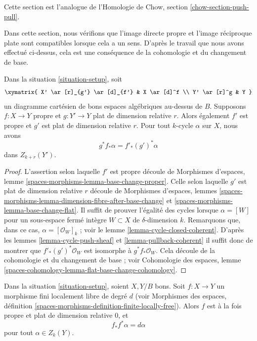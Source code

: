 \noindent
Cette section est l'analogue de l'Homologie de Chow, section
\ref{chow-section-push-pull}.

\medskip\noindent
Dans cette section, nous vérifions que l'image directe propre et l'image
réciproque plate sont compatibles lorsque cela a un sens. D'après le travail que
nous avons effectué ci-dessus, cela est une conséquence de la cohomologie et
du changement de base.

\begin{lemma}
\label{lemma-flat-pullback-proper-pushforward}
Dans la situation \ref{situation-setup}, soit
$$
\xymatrix{
X' \ar[r]_{g'} \ar[d]_{f'} & X \ar[d]^f \\
Y' \ar[r]^g & Y
}
$$
un diagramme cartésien de bons espaces algébriques au-dessus de $B$.
Supposons $f : X \to Y$ propre et $g : Y' \to Y$ plat de dimension
relative $r$. Alors également $f'$ est propre et $g'$ est plat de dimension
relative $r$. Pour tout $k$-cycle $\alpha$ sur $X$, nous avons
$$
g^*f_*\alpha = f'_*(g')^*\alpha
$$
dans $Z_{k + r}(Y')$.
\end{lemma}

\begin{proof}
L'assertion selon laquelle $f'$ est propre découle de Morphismes d'espaces,
lemme \ref{spaces-morphisms-lemma-base-change-proper}. Celle selon laquelle
$g'$ est plat de dimension relative $r$ découle de Morphismes d'espaces, lemmes
\ref{spaces-morphisms-lemma-dimension-fibre-after-base-change} et
\ref{spaces-morphisms-lemma-base-change-flat}. Il suffit de prouver l'égalité
des cycles lorsque $\alpha = [W]$ pour un sous-espace fermé intègre $W
\subset X$ de $\delta$-dimension $k$. Remarquons que, dans ce cas, $\alpha
= [\mathcal{O}_W]_k$ ; voir le lemme \ref{lemma-cycle-closed-coherent}. D'après les
lemmes \ref{lemma-cycle-push-sheaf} et \ref{lemma-pullback-coherent} il suffit
donc de montrer que $f'_*(g')^*\mathcal{O}_W$ est isomorphe à
$g^*f_*\mathcal{O}_W$. Cela découle de la cohomologie et du changement de
base ; voir Cohomologie des espaces, lemme
\ref{spaces-cohomology-lemma-flat-base-change-cohomology}.
\end{proof}

\begin{lemma}
\label{lemma-finite-flat}
Dans la situation \ref{situation-setup}, soient $X, Y/B$ bons. Soit $f :
X \to Y$ un morphisme fini localement libre de degré $d$ (voir Morphismes des
espaces, définition \ref{spaces-morphisms-definition-finite-locally-free}).
Alors $f$ est à la fois propre et plat de dimension relative $0$, et
$$
f_*f^*\alpha = d\alpha
$$
pour tout $\alpha \in Z_k(Y)$.
\end{lemma}

